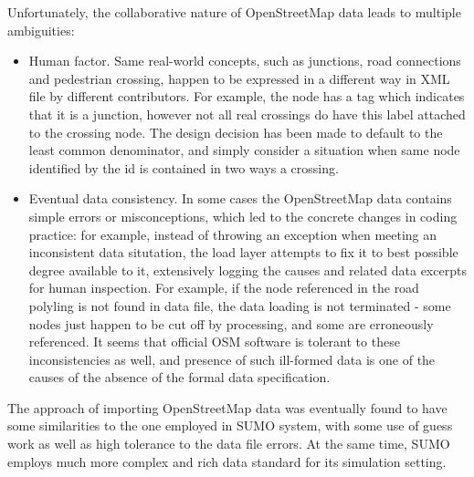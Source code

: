 Unfortunately, the collaborative nature of OpenStreetMap data leads to multiple ambiguities:
\begin{itemize}
    \item Human factor. Same real-world concepts, such as junctions, road connections and pedestrian crossing, happen to be expressed in a different way in XML file by different contributors. For example, the node has a tag which indicates that it is a junction, however not all real crossings do have this label attached to the crossing node. The design decision has been made to default to the least common denominator, and simply consider a situation when same node identified by the id is contained in two ways a crossing.
    \item Eventual data consistency. In some cases the OpenStreetMap data contains simple errors or misconceptions, which led to the concrete changes in coding practice: for example, instead of throwing an exception when meeting an inconsistent data situtation, the load layer attempts to fix it to best possible degree available to it, extensively logging the causes and related data excerpts for human inspection. For example, if the node referenced in the road polyling is not found in data file, the data loading is not terminated - some nodes just happen to be cut off by processing, and some are erroneously referenced. It seems that official OSM software is tolerant to these inconsistencies as well, and presence of such ill-formed data is one of the causes of the absence of the formal data specification.
\end{itemize}

The approach of importing OpenStreetMap data was eventually found to have some similarities to the one employed in SUMO system, with some use of guess work as well as high tolerance to the data file errors. At the same time, SUMO employs much more complex and rich data standard for its simulation setting.

